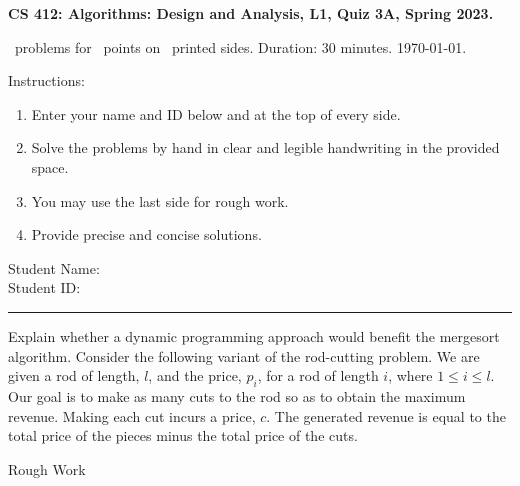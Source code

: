 \documentclass[addpoints,a4paper]{exam}
\begin{document}
\begin{flushleft}
  { \large \textsf{\textbf{CS 412: Algorithms: Design and Analysis, L1, Quiz 3A, Spring 2023.}}}\vspace{.5em}
  
  \numquestions\ problems for \numpoints\ points on \numpages\ printed sides. Duration: 30 minutes. \today.
\end{flushleft}

Instructions:
\begin{enumerate}
\item Enter your name and ID below and at the top of every side.
\item Solve the problems by hand in clear and legible handwriting in the provided space.
\item You may use the last side for rough work.
\item Provide precise and concise solutions.
\end{enumerate}

\noindent Student Name: \hrulefill \\[5pt]
\noindent Student ID: \hrulefill \\
\rule{\textwidth}{1pt}

\begin{questions}
\question[3] Explain whether a dynamic programming approach would benefit the mergesort algorithm.
\newpage
\question Consider the following variant of the rod-cutting problem. We are given a rod of length, $l$, and the price, $p_i$, for a rod of length $i$, where $1\leq i\leq l$. Our goal is to make as many cuts to the rod so as to obtain the maximum revenue. Making each cut incurs a price, $c$. The generated revenue is equal to the total price of the pieces minus the total price of the cuts.
\end{questions}

\newpage
\centerline{\large Rough Work}
\end{document}
